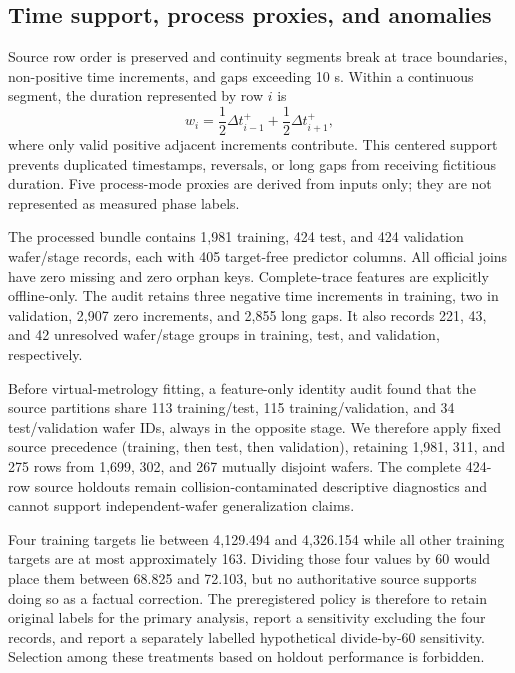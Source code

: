 \documentclass[10pt,twocolumn]{article}
\begin{document}
\subsection{Time support, process proxies, and anomalies}

Source row order is preserved and continuity segments break at trace
boundaries, non-positive time increments, and gaps exceeding 10 s. Within a
continuous segment, the duration represented by row $i$ is
\begin{equation}
 w_i=\frac{1}{2}\Delta t_{i-1}^{+}
    +\frac{1}{2}\Delta t_{i+1}^{+},
 \label{eq:time-support}
\end{equation}
where only valid positive adjacent increments contribute. This centered
support prevents duplicated timestamps, reversals, or long gaps from receiving
fictitious duration. Five process-mode proxies are derived from inputs only;
they are not represented as measured phase labels.

The processed bundle contains 1,981 training, 424 test, and 424 validation
wafer/stage records, each with 405 target-free predictor columns. All official
joins have zero missing and zero orphan keys. Complete-trace features are
explicitly offline-only. The audit retains three negative time increments in
training, two in validation, 2,907 zero increments, and 2,855 long gaps. It
also records 221, 43, and 42 unresolved wafer/stage groups in training, test,
and validation, respectively.

Before virtual-metrology fitting, a feature-only identity audit found that the
source partitions share 113 training/test, 115 training/validation, and 34
test/validation wafer IDs, always in the opposite stage. We therefore apply
fixed source precedence (training, then test, then validation), retaining
1,981, 311, and 275 rows from 1,699, 302, and 267 mutually disjoint wafers.
The complete 424-row source holdouts remain collision-contaminated descriptive
diagnostics and cannot support independent-wafer generalization claims.

Four training targets lie between 4,129.494 and 4,326.154 while all other
training targets are at most approximately 163. Dividing those four values by
60 would place them between 68.825 and 72.103, but no authoritative source
supports doing so as a factual correction. The preregistered policy is
therefore to retain original labels for the primary analysis, report a
sensitivity excluding the four records, and report a separately labelled
hypothetical divide-by-60 sensitivity. Selection among these treatments based
on holdout performance is forbidden.
\end{document}
